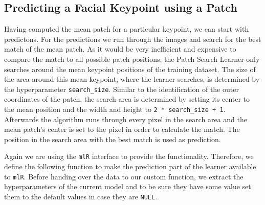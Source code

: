 \documentclass[]{article}
\newenvironment{Shaded}{\begin{snugshade}}{\end{snugshade}}
\newcommand{\KeywordTok}[1]{\textcolor[rgb]{0.13,0.29,0.53}{\textbf{{#1}}}}
\newcommand{\DataTypeTok}[1]{\textcolor[rgb]{0.13,0.29,0.53}{{#1}}}
\newcommand{\DecValTok}[1]{\textcolor[rgb]{0.00,0.00,0.81}{{#1}}}
\newcommand{\StringTok}[1]{\textcolor[rgb]{0.31,0.60,0.02}{{#1}}}
\newcommand{\NormalTok}[1]{{#1}}
\begin{document}
\hypertarget{patch-search-pred}{\subsection{Predicting a Facial Keypoint
using a Patch}\label{patch-search-pred}}

Having computed the mean patch for a particular keypoint, we can start
with predictons. For the predictions we run through the images and
search for the best match of the mean patch. As it would be very
inefficient and expensive to compare the match to all possible patch
positions, the Patch Search Learner only searches around the mean
keypoint positions of the training dataset. The size of the area around
this mean keypoint, where the learner searches, is determined by the
hyperparameter \texttt{search\_size}. Similar to the identification of
the outer coordinates of the patch, the search area is determined by
setting its center to the mean position and the width and height to
\texttt{2\ *\ search\_size\ +\ 1}. Afterwards the algorithm runs through
every pixel in the search area and the mean patch's center is set to the
pixel in order to calculate the match. The position in the search area
with the best match is used as prediction.

Again we are using the \texttt{mlR} interface to provide the
functionality. Therefore, we define the following function to make the
prediction part of the learner available to \texttt{mlR}. Before handing
over the data to our custom function, we extract the hyperparameters of
the current model and to be sure they have some value set them to the
default values in case they are \texttt{NULL}.

\begin{Shaded}
\end{Shaded}
\end{document}
